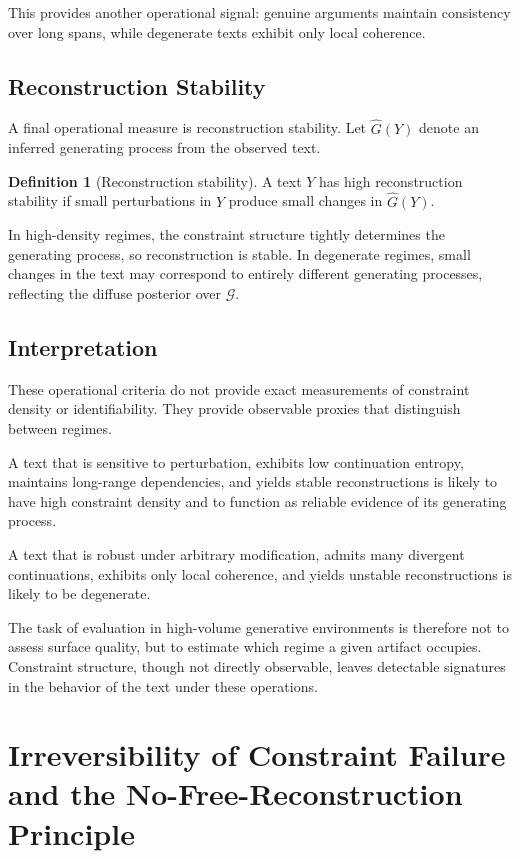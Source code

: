 \documentclass[12pt, oneside]{article}
\theoremstyle{plain}
\theoremstyle{definition}
\newtheorem{definition}[theorem]{Definition}
\theoremstyle{remark}
\begin{document}
This provides another operational signal: genuine arguments maintain consistency
over long spans, while degenerate texts exhibit only local coherence.

\subsection{Reconstruction Stability}

A final operational measure is reconstruction stability. Let $\hat{G}(Y)$ denote
an inferred generating process from the observed text.

\begin{definition}[Reconstruction stability]
A text $Y$ has high reconstruction stability if small perturbations in $Y$
produce small changes in $\hat{G}(Y)$.
\end{definition}

In high-density regimes, the constraint structure tightly determines the
generating process, so reconstruction is stable. In degenerate regimes,
small changes in the text may correspond to entirely different generating
processes, reflecting the diffuse posterior over $\mathcal{G}$.

\subsection{Interpretation}

These operational criteria do not provide exact measurements of constraint density
or identifiability. They provide observable proxies that distinguish between regimes.

A text that is sensitive to perturbation, exhibits low continuation entropy,
maintains long-range dependencies, and yields stable reconstructions is likely to
have high constraint density and to function as reliable evidence of its generating
process.

A text that is robust under arbitrary modification, admits many divergent
continuations, exhibits only local coherence, and yields unstable reconstructions
is likely to be degenerate.

The task of evaluation in high-volume generative environments is therefore not to
assess surface quality, but to estimate which regime a given artifact occupies.
Constraint structure, though not directly observable, leaves detectable signatures
in the behavior of the text under these operations.

\section{Irreversibility of Constraint Failure and the No-Free-Reconstruction Principle}
\end{document}
